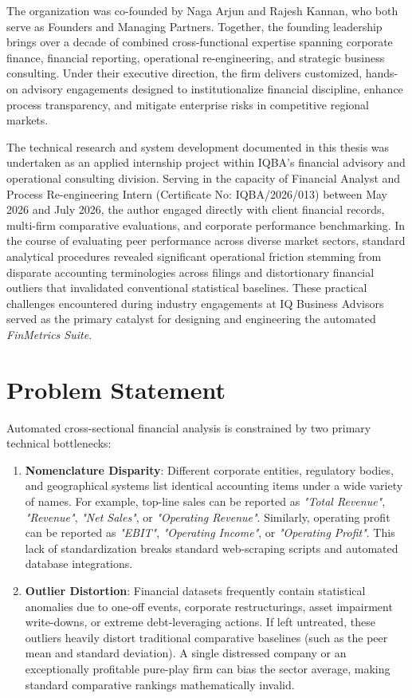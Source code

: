 The organization was co-founded by Naga Arjun and Rajesh Kannan, who both serve as Founders and Managing Partners. Together, the founding leadership brings over a decade of combined cross-functional expertise spanning corporate finance, financial reporting, operational re-engineering, and strategic business consulting. Under their executive direction, the firm delivers customized, hands-on advisory engagements designed to institutionalize financial discipline, enhance process transparency, and mitigate enterprise risks in competitive regional markets.

The technical research and system development documented in this thesis was undertaken as an applied internship project within IQBA's financial advisory and operational consulting division. Serving in the capacity of Financial Analyst and Process Re-engineering Intern (Certificate No: IQBA/2026/013) between May 2026 and July 2026, the author engaged directly with client financial records, multi-firm comparative evaluations, and corporate performance benchmarking. In the course of evaluating peer performance across diverse market sectors, standard analytical procedures revealed significant operational friction stemming from disparate accounting terminologies across filings and distortionary financial outliers that invalidated conventional statistical baselines. These practical challenges encountered during industry engagements at IQ Business Advisors served as the primary catalyst for designing and engineering the automated \textit{FinMetrics Suite}.

\section{Problem Statement}
Automated cross-sectional financial analysis is constrained by two primary technical bottlenecks:
\begin{enumerate}
    \item \textbf{Nomenclature Disparity}: Different corporate entities, regulatory bodies, and geographical systems list identical accounting items under a wide variety of names. For example, top-line sales can be reported as \textit{"Total Revenue"}, \textit{"Revenue"}, \textit{"Net Sales"}, or \textit{"Operating Revenue"}. Similarly, operating profit can be reported as \textit{"EBIT"}, \textit{"Operating Income"}, or \textit{"Operating Profit"}. This lack of standardization breaks standard web-scraping scripts and automated database integrations.
    \item \textbf{Outlier Distortion}: Financial datasets frequently contain statistical anomalies due to one-off events, corporate restructurings, asset impairment write-downs, or extreme debt-leveraging actions. If left untreated, these outliers heavily distort traditional comparative baselines (such as the peer mean and standard deviation). A single distressed company or an exceptionally profitable pure-play firm can bias the sector average, making standard comparative rankings mathematically invalid.
\end{enumerate}


